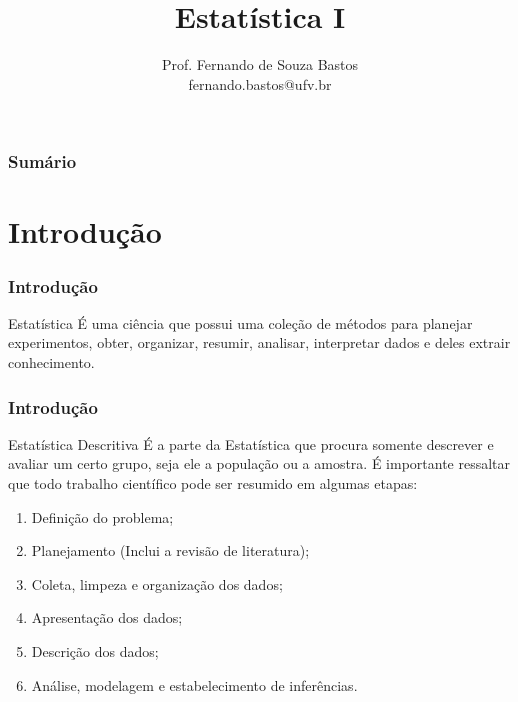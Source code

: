 \documentclass[12pt]{beamer}
\title{Estatística I}
\author{Prof. Fernando de Souza Bastos \texorpdfstring{\\ fernando.bastos@ufv.br}{}}
\institute{Departamento de Estatística\texorpdfstring{\\ Universidade Federal de Viçosa}{}\texorpdfstring{\\ Campus UFV - Viçosa}{}}
\date{}
\begin{document}

\frame{\titlepage}

\begin{frame}{}
\frametitle{\bf Sumário}
\tableofcontents
\end{frame}

\section{Introdução}
\begin{frame}{}
\frametitle{Introdução}
\vspace{-0.3cm}
\begin{block}{Estatística}
\justifying
É uma ciência que possui uma coleção de métodos para planejar experimentos, obter, organizar, resumir, analisar, interpretar dados e deles extrair conhecimento.
\end{block}

\end{frame}

\begin{frame}{}
	\frametitle{Introdução}
	\begin{block}{Estatística Descritiva}
		\justifying
		É a parte da Estatística que procura somente descrever e avaliar um certo grupo, seja ele a população ou a amostra. É importante ressaltar que todo trabalho científico pode ser resumido em algumas etapas:
	\end{block}
	\pause
	\begin{enumerate}
		\item Definição do problema;\pause
		\item Planejamento (Inclui a revisão de literatura);\pause
		\item Coleta, limpeza e organização dos dados;\pause
		\item Apresentação dos dados;\pause
		\item Descrição dos dados;\pause
		\item Análise, modelagem e estabelecimento de inferências.
	\end{enumerate}
\end{frame}
\end{document}
